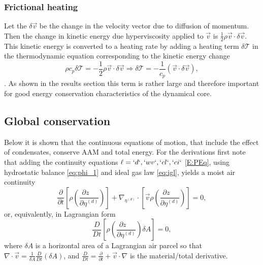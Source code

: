 \documentclass{agujournal}
\begin{document}
\subsubsection{Frictional heating}
Let the $\delta \vec{v}$ be the change in the velocity vector due to diffusion of momentum. Then the change in kinetic energy due hyperviscosity applied to $\vec{v}$ is $\frac{1}{2}\rho \vec{v} \cdot \delta \vec{v}$. This kinetic energy is converted to a heating rate by adding a heating term $\delta \mathcal{T}$ in the thermodynamic equation corresponding to the kinetic energy change
\begin{equation}
\rho c_p \delta \mathcal{T}=-\frac{1}{2}\rho \vec{v} \cdot \delta \vec{v} \Rightarrow
 \delta \mathcal{T}=-\frac{1}{c_p}\left(\vec{v}\cdot \delta \vec{v}\right),\label{eq:tcp}
\end{equation}
\citep[p.71 in ][]{CAM5}. As shown in the results section this term is rather large and therefore important for good energy conservation characteristics of the dynamical core.
\subsection{Global conservation}
Below it is shown that the continuous equations of motion, that include the effect of condensates, conserve AAM and total energy. For the derivations first note that adding the continuity equations $\ell=`d`,`wv`,`cl`,`ci`$ \eqref{E:PEq}, using hydrostatic balance \eqref{eq:phi_1} and ideal gas law \eqref{eq:igl}, yields a moist air continuity
\begin{equation}
\frac{\partial }{\partial t}\left[ \rho \left(\frac{\partial z\quad}{\partial \eta^{(d)}}\right)\right]+\nabla_{\eta^{(d)}} \cdot \left[ \vec{v}\rho  \left( \frac{\partial z\quad }{\partial \eta^{(d)}}\right)\right]=0,\label{eq:cont2}
\end{equation}
or, equivalently, in Lagrangian form
\begin{equation}
\frac{D}{Dt}\left[ \rho \left( \frac{\partial z\quad }{\partial \eta^{(d)}}\right)\delta A\right]=0,\label{eq:lagra_cont}
\end{equation}
where $\delta A$ is a horizontal area of a Lagrangian air parcel so that $\nabla \cdot \vec{v}=\frac{1}{\delta A}\frac{D}{Dt}\left( \delta A\right)$, and  $\frac{D}{Dt}=\frac{\partial }{\partial t}+\vec{v}\cdot \nabla $ is the material/total derivative. 
\end{document}
